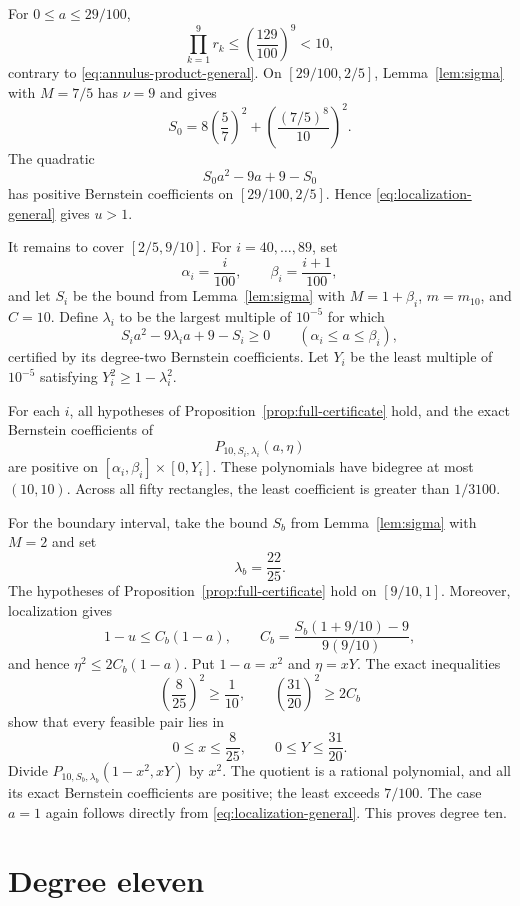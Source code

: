 \documentclass[11pt]{article}
\theoremstyle{remark}
\begin{document}
For $0\le a\le29/100$,
\[
 \prod_{k=1}^9r_k\le\left(\frac{129}{100}\right)^9<10,
\]
contrary to \eqref{eq:annulus-product-general}.  On
$[29/100,2/5]$, Lemma~\ref{lem:sigma} with $M=7/5$ has $\nu=9$ and gives
\[
 S_0=8\left(\frac57\right)^2
 +\left(\frac{(7/5)^8}{10}\right)^2.
\]
The quadratic
\[
 S_0a^2-9a+9-S_0
\]
has positive Bernstein coefficients on $[29/100,2/5]$.  Hence
\eqref{eq:localization-general} gives $u>1$.

It remains to cover $[2/5,9/10]$.  For $i=40,\ldots,89$, set
\[
 \alpha_i=\frac{i}{100},
 \qquad
 \beta_i=\frac{i+1}{100},
\]
and let $S_i$ be the bound from Lemma~\ref{lem:sigma} with
$M=1+\beta_i$, $m=m_{10}$, and $C=10$.  Define $\lambda_i$ to be the largest
multiple of $10^{-5}$ for which
\[
 S_i a^2-9\lambda_i a+9-S_i\ge0
 \qquad(\alpha_i\le a\le\beta_i),
\]
certified by its degree-two Bernstein coefficients.  Let $Y_i$ be the least
multiple of $10^{-5}$ satisfying
$Y_i^2\ge1-\lambda_i^2$.

For each $i$, all hypotheses of
Proposition~\ref{prop:full-certificate} hold, and the exact Bernstein
coefficients of
\[
 P_{10,S_i,\lambda_i}(a,\eta)
\]
are positive on
$[\alpha_i,\beta_i]\times[0,Y_i]$.  These polynomials have bidegree at most
$(10,10)$.  Across all fifty rectangles, the least coefficient is greater
than $1/3100$.

For the boundary interval, take the bound $S_b$ from
Lemma~\ref{lem:sigma} with $M=2$ and set
\[
 \lambda_b=\frac{22}{25}.
\]
The hypotheses of Proposition~\ref{prop:full-certificate} hold on
$[9/10,1]$.  Moreover, localization gives
\[
 1-u\le C_b(1-a),
 \qquad
 C_b=\frac{S_b(1+9/10)-9}{9(9/10)},
\]
and hence $\eta^2\le2C_b(1-a)$.  Put $1-a=x^2$ and $\eta=xY$.  The exact
inequalities
\[
 \left(\frac8{25}\right)^2\ge\frac1{10},
 \qquad
 \left(\frac{31}{20}\right)^2\ge2C_b
\]
show that every feasible pair lies in
\[
 0\le x\le\frac8{25},
 \qquad
 0\le Y\le\frac{31}{20}.
\]
Divide $P_{10,S_b,\lambda_b}(1-x^2,xY)$ by $x^2$.
The quotient is a rational polynomial, and all its exact Bernstein
coefficients are positive; the least exceeds $7/100$.  The case $a=1$ again
follows directly from \eqref{eq:localization-general}.  This proves degree
ten.

\section{Degree eleven}
\end{document}
